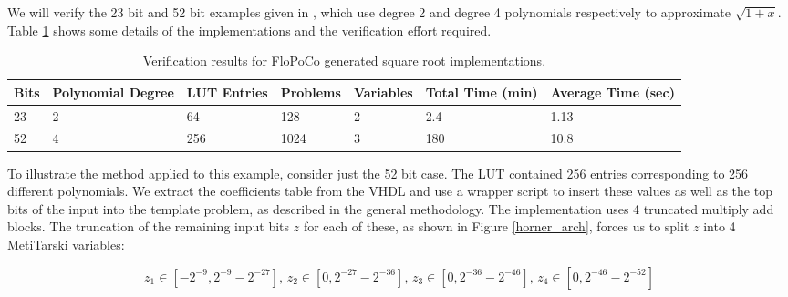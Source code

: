 \documentclass{fac}
\begin{document}
We will verify the 23 bit and 52 bit examples given in \cite{DinJolPas2010-poly}, which use degree 2 and degree 4 polynomials respectively to approximate $\sqrt{1+x}$. Table \ref{flopo_results} shows some details of the implementations and the verification effort required. 

\begin{center}
\begin{table}
\begin{tabular}{lllllll}
\toprule
Bits & Polynomial Degree & LUT Entries & Problems & Variables & Total Time (min) & Average Time (sec)\\
\midrule
23 & 2 & 64 & 128 & 2 & 2.4 & 1.13 \\
52 & 4 & 256 & 1024 & 3 & 180 & 10.8\\
\bottomrule
\end{tabular}	
\caption{Verification results for FloPoCo generated square root implementations.}\label{flopo_results}     
\end{table}
\end{center}

To illustrate the method applied to this example, consider just the 52 bit case. The LUT contained 256 entries corresponding to 256 different polynomials. We extract the coefficients table from the VHDL and use a wrapper script to insert these values as well as the top bits of the input into the template problem, as described in the general methodology. The implementation uses 4 truncated multiply add blocks. The truncation of the remaining input bits $z$ for each of these, as shown in Figure \ref{horner_arch}, forces us to split $z$ into 4 MetiTarski variables:
\begin{center}
\end{center}

\begin{equation*}
    z_1 \in [-2^{-9}, 2^{-9}-2^{-27}], \,
    z_2 \in [0, 2^{-27} - 2^{-36}],\,
    z_3 \in [0, 2^{-36} - 2^{-46}],\,
    z_4 \in [0, 2^{-46} - 2^{-52}]
\end{equation*}
\end{document}
